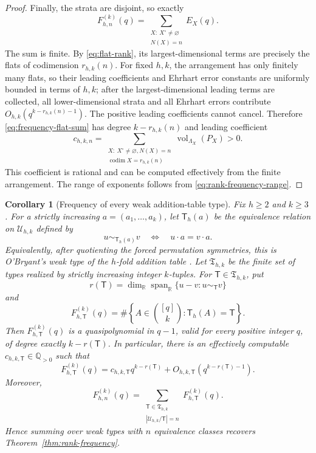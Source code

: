 \documentclass[11pt,reqno]{amsart}
\newtheorem{corollary}[theorem]{Corollary}
\theoremstyle{definition}
\theoremstyle{remark}
\newcommand{\N}{\mathbb N}
\begin{document}
\begin{proof}
Finally, the strata are disjoint, so exactly
\begin{equation}\label{eq:frequency-flat-sum}
 F^{(k)}_{h,n}(q)=
 \sum_{\substack{X:\ X^\circ\ne\varnothing\\N(X)=n}}E_X(q).
\end{equation}
The sum is finite.  By \eqref{eq:flat-rank}, its largest-dimensional terms
are precisely the flats of codimension $r_{h,k}(n)$.  For fixed $h,k$, the
arrangement has only finitely many flats, so their leading coefficients and
Ehrhart error constants are uniformly bounded in terms of $h,k$; after the
largest-dimensional leading terms are collected, all lower-dimensional
strata and all Ehrhart errors contribute
$O_{h,k}(q^{k-r_{h,k}(n)-1})$.  The positive leading coefficients cannot
cancel.  Therefore
\eqref{eq:frequency-flat-sum} has degree $k-r_{h,k}(n)$ and leading
coefficient
\begin{equation}\label{eq:rank-frequency-constant}
 c_{h,k,n}=
 \sum_{\substack{X:\ X^\circ\ne\varnothing, N(X)=n\\
          \operatorname{codim}X=r_{h,k}(n)}}
       \operatorname{vol}_{\Lambda_X}(P_X)>0.
\end{equation}
This coefficient is rational and can be computed effectively from the finite
arrangement.
The range of exponents follows from \eqref{eq:rank-frequency-range}.
\end{proof}

\begin{corollary}[Frequency of every weak addition-table type]
\label{cor:addition-type-frequency}
Fix $h\geq2$ and $k\geq3$.  For a strictly increasing
$a=(a_1,\ldots,a_k)$, let $\mathsf T_h(a)$ be the equivalence relation on
$\mathcal U_{h,k}$ defined by
\[
 u\sim_{\mathsf T_h(a)}v
 \quad\Longleftrightarrow\quad
 u\cdot a=v\cdot a.
\]
Equivalently, after quotienting the forced permutation symmetries, this is
O'Bryant's weak type of the $h$-fold addition table
\cite[Section~3]{OBryant2025}.
Let $\mathfrak T_{h,k}$ be the finite set of types realized by strictly
increasing integer $k$-tuples.  For $\mathsf T\in\mathfrak T_{h,k}$, put
\[
 r(\mathsf T)=\dim_{\mathbb R}
 \operatorname{span}_{\mathbb R}
 \{u-v:u\sim_{\mathsf T}v\}
\]
and
\[
 F^{(k)}_{h,\mathsf T}(q)=
 \#\left\{A\in\binom{[q]}k:\mathsf T_h(A)=\mathsf T\right\}.
\]
Then $F^{(k)}_{h,\mathsf T}(q)$ is a quasipolynomial in $q-1$, valid for
every positive integer $q$, of degree exactly $k-r(\mathsf T)$.  In
particular, there is an effectively computable
$c_{h,k,\mathsf T}\in\mathbb Q_{>0}$ such that
\begin{equation}\label{eq:addition-type-frequency}
 F^{(k)}_{h,\mathsf T}(q)
 =c_{h,k,\mathsf T}q^{k-r(\mathsf T)}
  +O_{h,k,\mathsf T}\!\left(q^{k-r(\mathsf T)-1}\right).
\end{equation}
Moreover,
\begin{equation}\label{eq:type-sum-frequency}
 F^{(k)}_{h,n}(q)=
 \sum_{\substack{\mathsf T\in\mathfrak T_{h,k}\\
 |\mathcal U_{h,k}/\mathsf T|=n}}
 F^{(k)}_{h,\mathsf T}(q).
\end{equation}
Hence summing over weak types with $n$ equivalence classes recovers
Theorem~\ref{thm:rank-frequency}.
\end{corollary}
\end{document}
